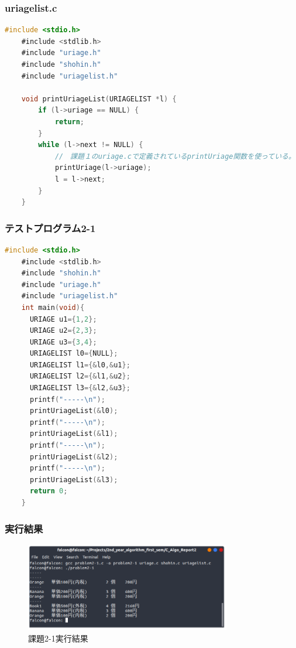 \documentclass[10pt]{article}
\begin{document}
\subsubsection{uriagelist.c}
\begin{lstlisting}[language=C]
    #include <stdio.h>
    #include <stdlib.h>
    #include "uriage.h"
    #include "shohin.h"
    #include "uriagelist.h"
    
    void printUriageList(URIAGELIST *l) {
        if (l->uriage == NULL) {
            return;
        }
        while (l->next != NULL) {
            //　課題１のuriage.cで定義されているprintUriage関数を使っている。
            printUriage(l->uriage);
            l = l->next;
        }
    }
\end{lstlisting}

\subsubsection{テストプログラム2-1}
\begin{lstlisting}[language=C]
    #include <stdio.h>
    #include <stdlib.h>
    #include "shohin.h"
    #include "uriage.h"
    #include "uriagelist.h"
    int main(void){
      URIAGE u1={1,2};
      URIAGE u2={2,3};
      URIAGE u3={3,4};
      URIAGELIST l0={NULL};
      URIAGELIST l1={&l0,&u1};
      URIAGELIST l2={&l1,&u2};
      URIAGELIST l3={&l2,&u3};
      printf("-----\n");
      printUriageList(&l0);
      printf("-----\n");
      printUriageList(&l1);
      printf("-----\n");
      printUriageList(&l2);
      printf("-----\n");
      printUriageList(&l3);
      return 0;
    }
\end{lstlisting}

\subsubsection{実行結果}
\begin{figure}[H]
	\centering
	\includegraphics[width=0.8\textwidth]{problem2-1.png}
	\caption{課題2-1実行結果}
\end{figure}
\end{document}

